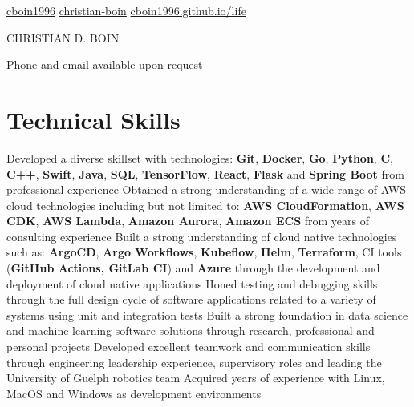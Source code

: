 \documentclass[a4paper,11pt]{article}
\newcommand{\name}{CHRISTIAN D. BOIN} %
\newcommand{\github}{cboin1996} %
\newcommand{\linkedin}{christian-boin-masc-ai-6b705a135} %
\begin{document}
\selectfont


\newcommand{\iconspace}{0.4mm}
\newcommand{\headingsep}{1cm}
\begin{center}
	\small{\href{https://github.com/\github}{\faGithub \hspace{\iconspace} \github} \hspace{\headingsep}
		\href{https://www.linkedin.com/in/\linkedin/}{\faLinkedinSquare \hspace{\iconspace} christian-boin} \hspace{\headingsep}
		\href{https://cboin1996.github.io/life/}{\faFileCodeO \hspace{\iconspace} cboin1996.github.io/life}
	}
\end{center}
\begin{center}
	\vspace{-0.4cm}
	\huge{{\name}}
\end{center}
\begin{center}
	\vspace{-0.2cm}
	\tiny{
		Phone and email available upon request
	}
\end{center}
\section{Technical Skills}
\begin{entries}
	\ib Developed a diverse skillset with technologies: \textbf{Git}, \textbf{Docker}, \textbf{Go},
	\textbf{Python}, \textbf{C}, \textbf{C++}, \textbf{Swift}, \textbf{Java}, \textbf{SQL}, \textbf{TensorFlow}, \textbf{React},
	\textbf{Flask} and \textbf{Spring Boot} from professional experience
	\ib Obtained a strong understanding of a wide range of AWS cloud technologies including but not limited to:
        \textbf{AWS CloudFormation}, \textbf{AWS CDK}, \textbf{AWS Lambda},
        \textbf{Amazon Aurora}, \textbf{Amazon ECS} from years of consulting experience
	\ib Built a strong understanding of cloud native technologies such as: \textbf{ArgoCD}, \textbf{Argo Workflows},
	\textbf{Kubeflow}, \textbf{Helm},
	\textbf{Terraform}, CI tools (\textbf{GitHub Actions, GitLab CI}) and \textbf{Azure} through the development and deployment
	of cloud native applications
	\ib Honed testing and debugging skills through the full design cycle of software applications related
	to a variety of systems using unit and integration tests
	\ib Built a strong foundation in data science and machine learning software solutions through
	research, professional and personal projects
	\ib Developed excellent teamwork and communication skills through engineering leadership experience,
	supervisory roles and leading the University of Guelph robotics team
	\ib Acquired years of experience with Linux, MacOS and Windows as development environments
\end{entries}
\end{document}
